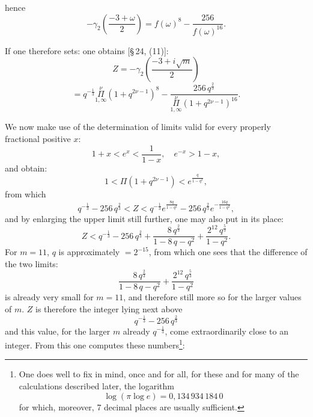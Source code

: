 hence
\[
-\gamma_2\left(\frac{-3+\omega}{2}\right) = f(\omega)^8 - \frac{256}{f(\omega)^{16}}.
\]

If one therefore sets:
one obtains [\S\,24, (11)]:
\[
Z = -\gamma_2\left(\frac{-3+i\sqrt{m}}{2}\right)
\]
\[
= q^{-\frac{1}{3}} \overset{\nu}{\underset{1,\infty}{\Pi}} (1+q^{2\nu-1})^8 - \frac{256\,q^{\frac{2}{3}}}{\overset{\nu}{\underset{1,\infty}{\Pi}} (1+q^{2\nu-1})^{16}}.
\]

We now make use of the determination of limits valid for every properly fractional positive $x$:
\[
1+x < e^x < \frac{1}{1-x}, \quad e^{-x} > 1-x,
\]
and obtain:
\[
1 < \Pi(1+q^{2\nu-1}) < e^{\frac{q}{1-q^2}},
\]
from which
\[
q^{-\frac{1}{3}} - 256\,q^{\frac{2}{3}} < Z < q^{-\frac{1}{3}} e^{\frac{8q}{1-q^2}} - 256\,q^{\frac{2}{3}} e^{-\frac{16q}{1-q^2}},
\]
and by enlarging the upper limit still further, one may also put in its place:
\[
Z < q^{-\frac{1}{3}} - 256\,q^{\frac{2}{3}} + \frac{8\,q^{\frac{2}{3}}}{1-8\,q-q^2} + \frac{2^{12}\,q^{\frac{5}{3}}}{1-q^2}.
\]
For $m=11$, $q$ is approximately $=2^{-15}$, from which one sees that the difference of the two limits:
\[
\frac{8\,q^{\frac{2}{3}}}{1-8\,q-q^2} + \frac{2^{12}\,q^{\frac{5}{3}}}{1-q^2}
\]
is already very small for $m=11$, and therefore still more so for the larger values of $m$. $Z$ is therefore the integer lying next above
\[
q^{-\frac{1}{3}} - 256\,q^{\frac{2}{3}}
\]
and this value, for the larger $m$ already $q^{-\frac{1}{3}}$, come extraordinarily close to an integer. %
From this one computes these numbers\footnote{One does well to fix in mind, once and for all, for these and for many of the calculations described later, the  logarithm
\[
\log(\pi \log e) = 0{,}134\,934\,184\,0
\]
for which, moreover, 7 decimal places are usually sufficient.}:
